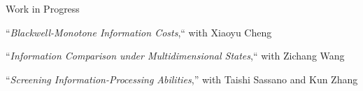 \begin{rSection}{Work in Progress}
	\begin{etaremune}
		
		\item ``\textit{Blackwell-Monotone Information Costs},`` with Xiaoyu Cheng
		
		\item ``\textit{Information Comparison under Multidimensional States},`` with Zichang Wang
		
		\item 	``\textit{Screening Information-Processing Abilities},'' with Taishi Sassano and Kun Zhang
		
	\end{etaremune}
\end{rSection}




\medskip

